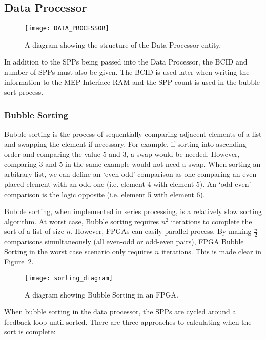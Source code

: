 		\subsection{Data Processor} %
		\label{sub:data_processor}

			\begin{figure}[ht]
				\centering
				\texttt{[image: DATA\_PROCESSOR]}
				\caption{A diagram showing the structure of the Data Processor entity. }
				\label{fig:data_processor_diagram}
			\end{figure}

			In addition to the SPPs being passed into the Data Processor, the BCID and number of SPPs must also be given.
			The BCID is used later when writing the information to the MEP Interface RAM and the SPP count is used in the bubble sort process.

		\subsubsection{Bubble Sorting}

			Bubble sorting is the process of sequentially comparing adjacent elements of a list and swapping the element if necessary.
			For example, if sorting into ascending order and comparing the value 5 and 3, a swap would be needed.
			However, comparing 3 and 5 in the same example would not need a swap.
			When sorting an arbitrary list, we can define an `even-odd' comparison as one comparing an even placed element with an odd one (i.e. element 4 with element 5).
			An `odd-even' comparison is the logic opposite (i.e. element 5 with element 6).
			\par
			Bubble sorting, when implemented in series processing, is a relatively slow sorting algorithm.
			At worst case, Bubble sorting requires $n^2$ iterations to complete the sort of a list of size $n$.
			However, FPGAs can easily parallel process.
			By making $\frac{n}{2}$ comparisons simultaneously (all even-odd or odd-even pairs), FPGA Bubble Sorting in the worst case scenario only requires $n$ iterations. This is made clear in Figure~\ref{fig:sorting}.

			\begin{figure}[ht]
				\centering
				\texttt{[image: sorting\_diagram]}
				\caption{A diagram showing Bubble Sorting in an FPGA.}
				\label{fig:sorting}
			\end{figure}

			When bubble sorting in the data processor, the SPPs are cycled around a feedback loop until sorted.
			There are three approaches to calculating when the sort is complete:

